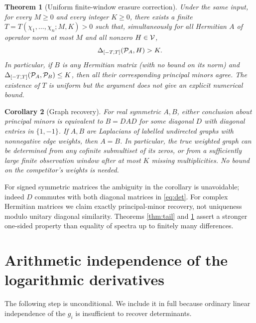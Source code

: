 \documentclass[11pt]{article}
\newtheorem{theorem}{Theorem}[section]
\newtheorem{corollary}[theorem]{Corollary}
\theoremstyle{definition}\newtheorem{definition}[theorem]{Definition}
\begin{document}
\begin{theorem}[Uniform finite-window erasure correction]\label{thm:finite}
Under the same input, for every $M\ge0$ and every integer $K\ge0$, there exists a finite $T=T(\chi_1,\ldots,\chi_n;M,K)>0$ such that, simultaneously for all Hermitian $A$ of operator norm at most $M$ and all nonzero $H\in\mathcal V$,
\[
                       \Delta_{[-T,T]}(\mathcal P_A,H)>K.
\]
In particular, if $B$ is any Hermitian matrix (with \emph{no} bound on its norm) and $\Delta_{[-T,T]}(\mathcal P_A,\mathcal P_B)\le K$, then all their corresponding principal minors agree. The existence of $T$ is uniform but the argument does not give an explicit numerical bound.
\end{theorem}

\begin{corollary}[Graph recovery]\label{cor:graph}
For real symmetric $A,B$, either conclusion about principal minors is equivalent to $B=DAD$ for some diagonal $D$ with diagonal entries in $\{1,-1\}$. If $A,B$ are Laplacians of labelled undirected graphs with nonnegative edge weights, then $A=B$. In particular, the true weighted graph can be determined from any cofinite submultiset of its zeros, or from a sufficiently large finite observation window after at most $K$ missing multiplicities. No bound on the competitor's weights is needed.
\end{corollary}
For signed symmetric matrices the ambiguity in the corollary is unavoidable; indeed $D$ commutes with both diagonal matrices in \eqref{eq:det}. For complex Hermitian matrices we claim exactly principal-minor recovery, not uniqueness modulo unitary diagonal similarity. Theorems \ref{thm:tail} and \ref{thm:finite} assert a stronger one-sided property than equality of spectra up to finitely many differences.

\section{Arithmetic independence of the logarithmic derivatives}
The following step is unconditional. We include it in full because ordinary linear independence of the $g_i$ is insufficient to recover determinants.
\end{document}
